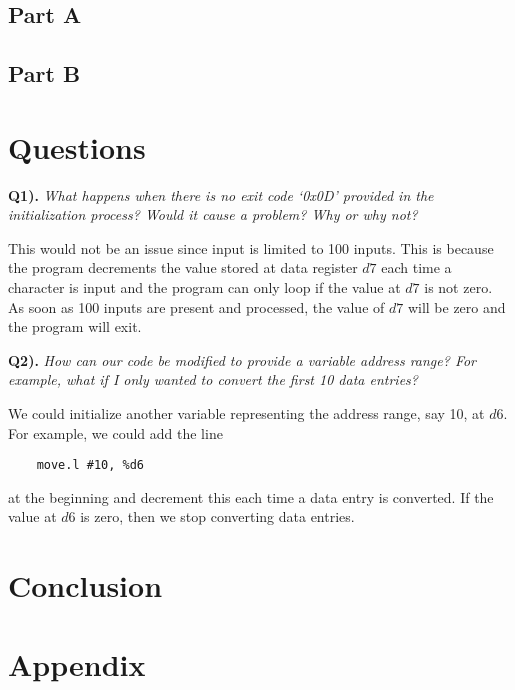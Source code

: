 \documentclass[10pt, letterpaper, titlepage]{article} %
\begin{document}
\begin{multicols*}{2}
\subsection{Part A}

\subsection{Part B}


\section{Questions}
\textbf{Q1).} \textit{What happens when there is no exit code `0x0D' provided in the initialization process? Would it cause a problem? Why or why not?}

This would not be an issue since input is limited to 100 inputs. This is because the program decrements the value stored at data register $d7$ each time a character is input and the program can only loop if the value at $d7$ is not zero. As soon as 100 inputs are present and processed, the value of $d7$ will be zero and the program will exit.

\textbf{Q2).} \textit{How can our code be modified to provide a variable address range? For example, what if I only wanted to convert the first 10 data entries?}

We could initialize another variable representing the address range, say 10, at $d6$. For example, we could add the line
\begin{lstlisting}
	move.l #10, %d6
\end{lstlisting}
at the beginning and decrement this each time a data entry is converted. If the value at $d6$ is zero, then we stop converting data entries.

\section{Conclusion}


\end{multicols*}


\section{Appendix}
\end{document}
